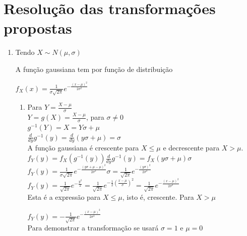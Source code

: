 \documentclass{article}
\begin{document}
\section{Resolução das transformações propostas}

\begin{enumerate}
  \item Tendo $X \sim N(\mu,\sigma)$
  
    A função gaussiana tem por função de distribuição

    $f_X(x) = \frac{1}{\sigma\sqrt{2\pi}}e^{-\frac{(x-\mu)^2}{2\sigma^2}}$
    
    \begin{enumerate}
      \item Para $Y = \frac{X-\mu}{\sigma}$\\
        
        $Y = g(X) = \frac{X-\mu}{\sigma}$, para $\sigma \neq 0$\\

        $g^{-1}(Y) = X = Y\sigma+\mu$\\

        $\frac{d}{dy}g^{-1}(y) = \frac{d}{dy}(y\sigma+\mu) = \sigma$\\

        A função gaussiana é crescente para $X \leq \mu$ e decrescente para $X > \mu$.\\

        $f_Y(y) = f_X(g^{-1}(y))\frac{d}{dy}g^{-1}(y) = f_X(y\sigma+\mu)\sigma$\\

        $f_Y(y) = \frac{1}{\sigma\sqrt{2\pi}}e^{-\frac{(y\sigma+\mu-\mu)^2}{2\sigma^2}}\sigma = \frac{1}{\sqrt{2\pi}}e^{-\frac{(y\sigma)^2}{2\sigma^2}}$\\
        
        $f_Y(y) = \frac{1}{\sqrt{2\pi}}e^{-\frac{y^2}{2}} = \frac{1}{\sqrt{2\pi}}e^{-\frac{1}{2}(\frac{x-\mu}{\sigma})^2} = \frac{1}{\sqrt{2\pi}}e^{-\frac{(x-\mu)^2}{2\sigma^2}}$\\

        Esta é a expressão para $X \leq \mu$, isto é, crescente. Para $X > \mu$
        
        $f_Y(y) = -\frac{1}{\sqrt{2\pi}}e^{-\frac{(x-\mu)^2}{2\sigma^2}}$\\

        Para demonstrar a transformação se usará $\sigma=1$ e $\mu=0$\\
        

\end{enumerate}
\end{enumerate}
\end{document}
